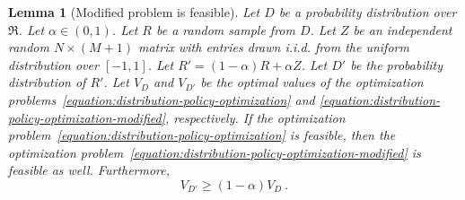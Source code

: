 \documentclass[12pt]{article}
\newcommand{\Requests}{\mathfrak{R}}
\newtheorem{lemma}[theorem]{Lemma}
\theoremstyle{definition}
\begin{document}
\begin{lemma}[Modified problem is feasible]
\label{lemma:modified-problem-is-feasible}
Let $D$ be a probability distribution over $\Requests$. Let $\alpha \in (0,1)$.
Let $R$ be a random sample from $D$. Let $Z$ be an independent random $N \times
(M+1)$ matrix with entries drawn i.i.d. from the uniform distribution over
$[-1,1]$. Let $R' = (1-\alpha)R + \alpha Z$. Let $D'$ be the probability
distribution of $R'$. Let $V_D$ and $V_{D'}$ be the optimal values of the optimization
problems~\eqref{equation:distribution-policy-optimization} and
\eqref{equation:distribution-policy-optimization-modified}, respectively. If the
optimization problem~\eqref{equation:distribution-policy-optimization} is
feasible, then the optimization
problem~\eqref{equation:distribution-policy-optimization-modified} is feasible
as well. Furthermore,
$$
V_{D'} \ge (1 - \alpha) V_D \: .
$$
\end{lemma}
\end{document}
